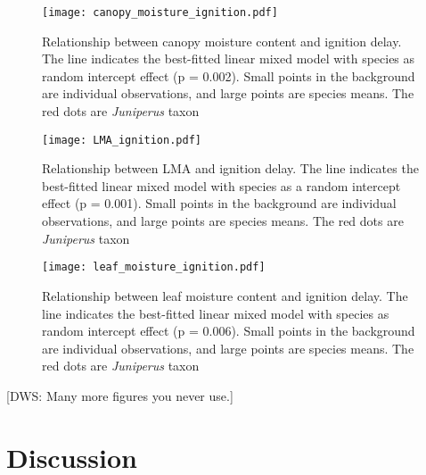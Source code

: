 \documentclass[12pt]{report}
\begin{document}
\begin{figure}
    \centering
    \texttt{[image: canopy\_moisture\_ignition.pdf]}
    \caption{Relationship between canopy moisture content and ignition delay. The line indicates the best-fitted linear mixed model with species as random intercept effect (p = 0.002). Small points in the background are individual observations, and large points are species means. The red dots are \emph{Juniperus} taxon}
\end{figure}

\begin{figure}
    \centering
    \texttt{[image: LMA\_ignition.pdf]}
    \caption{Relationship between LMA and ignition delay. The line indicates the best-fitted linear mixed model with species as a random intercept effect (p = 0.001). Small points in the background are individual observations, and large points are species means. The red dots are \emph{Juniperus} taxon}
\end{figure}



\begin{figure}
    \centering
    \texttt{[image: leaf\_moisture\_ignition.pdf]}
    \caption{Relationship between leaf moisture content and ignition delay. The line indicates the best-fitted linear mixed model with species as random intercept effect (p = 0.006). Small points in the background are individual observations, and large points are species means.  The red dots are \emph{Juniperus} taxon}

\end{figure}


[DWS: Many more figures you never use.]


\section{Discussion}
\end{document}
